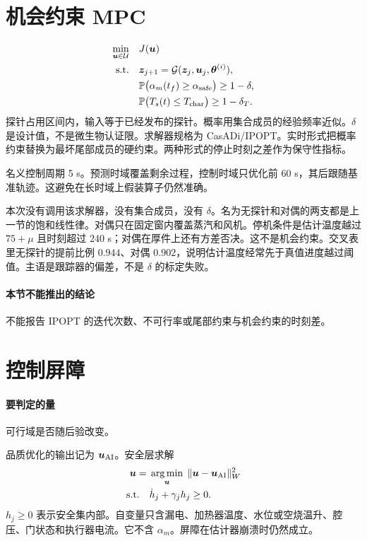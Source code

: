 \section{机会约束 MPC}

\begin{equation}
\label{eq:mpc}
\begin{aligned}
\min_{\bm{u}\in\mathcal{U}}\quad & J(\bm{u})\\
\mathrm{s.t.}\quad
&\bm{z}_{j+1}=\mathcal{G}(\bm{z}_j,\bm{u}_j,\bm{\theta}^{(i)}),\\
&\mathbb{P}\big(\alpha_m(t_f)\ge\alpha_{\mathrm{safe}}\big)\ge 1-\delta,\\
&\mathbb{P}\big(T_s(t)\le T_{\mathrm{char}}\big)\ge 1-\delta_T.
\end{aligned}
\end{equation}
探针占用区间内，输入等于已经发布的探针。概率用集合成员的经验频率近似。\(\delta\) 是设计值，不是微生物认证限。求解器规格为 CasADi/IPOPT。实时形式把概率约束替换为最坏尾部成员的硬约束。两种形式的停止时刻之差作为保守性指标。

名义控制周期 5 s。预测时域覆盖剩余过程，控制时域只优化前 60 s，其后跟随基准轨迹。这避免在长时域上假装算子仍然准确。

本次没有调用该求解器，没有集合成员，没有 \(\delta\)。名为无探针和对偶的两支都是上一节的饱和线性律。对偶只在固定窗内覆盖蒸汽和风机。停机条件是估计温度越过 \(75+\mu\) 且时刻超过 240 s；对偶在厚件上还有方差否决。这不是机会约束。交叉表里无探针的提前比例 \(0.944\)、对偶 \(0.902\)，说明估计温度经常先于真值进度越过阈值。主语是跟踪器的偏差，不是 \(\delta\) 的标定失败。

\paragraph{本节不能推出的结论}
不能报告 IPOPT 的迭代次数、不可行率或尾部约束与机会约束的时刻差。

\section{控制屏障}

\paragraph{要判定的量}
可行域是否随后验改变。

品质优化的输出记为 \(\bm{u}_{\mathrm{AI}}\)。安全层求解
\begin{equation}
\label{eq:cbf}
\begin{aligned}
\bm{u}={}&\operatorname*{arg\,min}_{\bm{u}}\;\|\bm{u}-\bm{u}_{\mathrm{AI}}\|_W^2\\
\mathrm{s.t.}\quad
&\dot h_j+\gamma_j h_j\ge 0.
\end{aligned}
\end{equation}
\(h_j\ge 0\) 表示安全集内部。自变量只含漏电、加热器温度、水位或空烧温升、腔压、门状态和执行器电流。它不含 \(\alpha_m\)。屏障在估计器崩溃时仍然成立。

